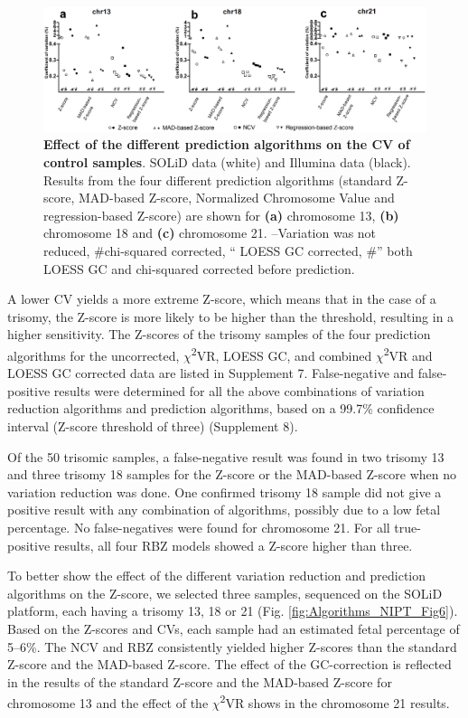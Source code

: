 \begin{figure}
	\includegraphics[width=1.0\linewidth]{img/Algorithms_NIPT_Fig5}
	\caption[Effect of the different prediction algorithms]{\textbf{Effect of the different prediction algorithms on the CV of control samples}. SOLiD data (white) and Illumina data (black). Results from the four different prediction algorithms (standard Z-score, MAD-based Z-score, Normalized Chromosome Value and regression-based Z-score) are shown for \textbf{(a)} chromosome 13, \textbf{(b)} chromosome 18 and \textbf{(c)} chromosome 21. –Variation was not reduced, \#chi-squared corrected, “ LOESS GC corrected, \#” both LOESS GC and chi-squared corrected before prediction.}
	\label{fig:Algorithms_NIPT_Fig5}
\end{figure}

A lower CV yields a more extreme Z-score, which means that in the case of a trisomy, the Z-score is more likely to be higher than the threshold, resulting in a higher sensitivity. 
The Z-scores of the trisomy samples of the four prediction algorithms for the uncorrected, $\chi$\textsuperscript{2}VR, LOESS GC, and combined $\chi$\textsuperscript{2}VR and LOESS GC corrected data are listed in Supplement 7. 
False-negative and false-positive results were determined for all the above combinations of variation reduction algorithms and prediction algorithms, based on a 99.7\% confidence interval (Z-score threshold of three) (Supplement 8).

Of the 50 trisomic samples, a false-negative result was found in two trisomy 13 and three trisomy 18 samples for the Z-score or the MAD-based Z-score when no variation reduction was done. 
One confirmed trisomy 18 sample did not give a positive result with any combination of algorithms, possibly due to a low fetal percentage. 
No false-negatives were found for chromosome 21. 
For all true-positive results, all four RBZ models showed a Z-score higher than three.

To better show the effect of the different variation reduction and prediction algorithms on the Z-score, we selected three samples, sequenced on the SOLiD platform, each having a trisomy 13, 18 or 21 (Fig. \ref{fig:Algorithms_NIPT_Fig6}). 
Based on the Z-scores and CVs, each sample had an estimated fetal percentage of 5–6\%. 
The NCV and RBZ consistently yielded higher Z-scores than the standard Z-score and the MAD-based Z-score. 
The effect of the GC-correction is reflected in the results of the standard Z-score and the MAD-based Z-score for chromosome 13 and the effect of the $\chi$\textsuperscript{2}VR shows in the chromosome 21 results.

